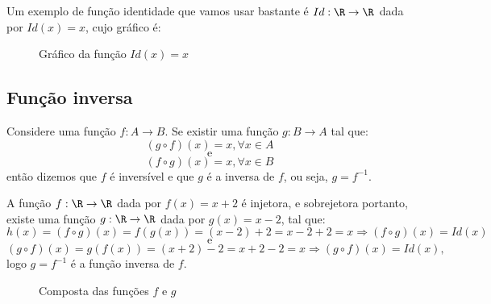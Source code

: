 Um exemplo de função identidade que vamos usar bastante é $Id: \R \rightarrow \R$ dada por $Id(x)= x$, cujo gráfico é:
\begin{figure}[H]
 \centering
    \caption{Gráfico da função $Id(x)=x$}
  \end{figure}

\subsection{Função inversa}

Considere uma função $f: A \rightarrow B$. Se existir uma função $g: B \rightarrow A$ tal que:
\[(g \circ f)(x)= x, \forall x \in A\]
\[ \text {e}\]
\[(f \circ g)(x)= x, \forall x \in B\]
então dizemos que $f$ é inversível e que $g$ é a inversa de $f$, ou seja, $g= f^{-1}$.

\begin{exem}
 A função $f: \R \rightarrow \R$ dada por $f(x)= x+2$ é injetora, e sobrejetora portanto, existe uma função $g: \R \rightarrow \R$ dada por $g(x)= x-2$, tal que:
 \[h(x)= (f \circ g)(x)= f(g(x))= (x-2) + 2= x-2+2= x \Rightarrow (f \circ g)(x)= Id(x)\]
 \[\text{e}\]
 \[(g \circ f)(x)= g(f(x))= (x+2) - 2= x+2-2= x \Rightarrow (g \circ f)(x)= Id(x) ,\]
 logo $g= f^{-1}$ é a função inversa de $f$.

 \begin{figure}[H]
 \centering
    \caption{Composta das funções $f$ e $g$}
  \end{figure}

\end{exem}


